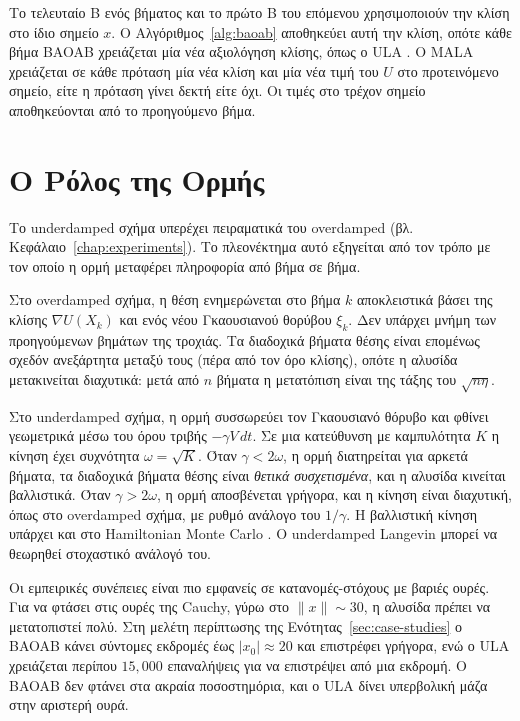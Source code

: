 Το τελευταίο B ενός βήματος και το πρώτο B του επόμενου χρησιμοποιούν την κλίση
στο ίδιο σημείο $x$. Ο Αλγόριθμος~\ref{alg:baoab} αποθηκεύει αυτή την κλίση, οπότε κάθε
βήμα BAOAB χρειάζεται μία νέα αξιολόγηση κλίσης, όπως ο ULA
\citep{leimkuhler2013bao}. Ο MALA χρειάζεται σε κάθε πρόταση μία νέα κλίση και μία
νέα τιμή του $U$ στο προτεινόμενο σημείο, είτε η πρόταση γίνει δεκτή είτε όχι. Οι
τιμές στο τρέχον σημείο αποθηκεύονται από το προηγούμενο βήμα.

\section{Ο Ρόλος της Ορμής}
\label{sec:alg-momentum-role}

Το underdamped σχήμα υπερέχει πειραματικά του overdamped (βλ.
Κεφάλαιο~\ref{chap:experiments}). Το πλεονέκτημα αυτό εξηγείται από τον τρόπο
με τον οποίο η ορμή μεταφέρει πληροφορία από βήμα σε βήμα.

Στο overdamped σχήμα, η θέση ενημερώνεται στο βήμα $k$ αποκλειστικά βάσει
της κλίσης $\nabla U(X_k)$ και ενός νέου Γκαουσιανού θορύβου $\xi_k$. Δεν
υπάρχει μνήμη των προηγούμενων βημάτων της τροχιάς. Τα διαδοχικά βήματα
θέσης είναι επομένως σχεδόν ανεξάρτητα μεταξύ τους (πέρα από τον όρο
κλίσης), οπότε η αλυσίδα μετακινείται διαχυτικά: μετά από $n$ βήματα η
μετατόπιση είναι της τάξης του $\sqrt{n\eta}$.

Στο underdamped σχήμα, η ορμή συσσωρεύει τον Γκαουσιανό θόρυβο και
φθίνει γεωμετρικά μέσω του όρου τριβής
$-\gamma V \, dt$. Σε μια κατεύθυνση με καμπυλότητα $K$ η κίνηση έχει συχνότητα
$\omega = \sqrt{K}$. Όταν $\gamma < 2\omega$, η ορμή διατηρείται για αρκετά βήματα, τα
διαδοχικά βήματα θέσης είναι \emph{θετικά συσχετισμένα}, και η αλυσίδα κινείται
βαλλιστικά. Όταν $\gamma > 2\omega$, η ορμή αποσβένεται γρήγορα, και η κίνηση είναι
διαχυτική, όπως στο overdamped σχήμα, με ρυθμό ανάλογο του $1/\gamma$. Η βαλλιστική
κίνηση υπάρχει και στο Hamiltonian Monte Carlo \citep{neal2011mcmc}. Ο underdamped Langevin μπορεί να
θεωρηθεί στοχαστικό ανάλογό του.

Οι εμπειρικές συνέπειες είναι πιο εμφανείς σε κατανομές-στόχους με βαριές ουρές.
Για να φτάσει στις ουρές της Cauchy, γύρω στο $\|x\| \sim 30$, η αλυσίδα πρέπει
να μετατοπιστεί πολύ. Στη μελέτη περίπτωσης της Ενότητας~\ref{sec:case-studies} ο
BAOAB κάνει σύντομες εκδρομές έως $|x_0| \approx 20$ και επιστρέφει γρήγορα, ενώ ο ULA
χρειάζεται περίπου $15{,}000$ επαναλήψεις για να επιστρέψει από μια εκδρομή. Ο BAOAB
δεν φτάνει στα ακραία ποσοστημόρια, και ο ULA δίνει υπερβολική μάζα στην αριστερή ουρά.

